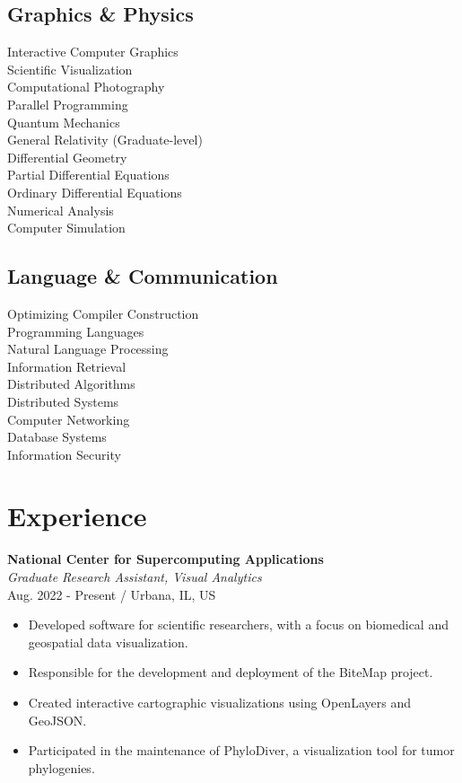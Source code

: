 \documentclass[11pt,twocolumn]{article}
\begin{document}
\subsection*{{Graphics \& Physics}}
Interactive Computer Graphics\\
Scientific Visualization\\
Computational Photography\\
Parallel Programming\\
Quantum Mechanics\\
General Relativity (Graduate-level)\\
Differential Geometry\\
Partial Differential Equations\\
Ordinary Differential Equations\\
Numerical Analysis\\
Computer Simulation

\subsection*{{Language \& Communication}}

Optimizing Compiler Construction\\
Programming Languages\\
Natural Language Processing\\
Information Retrieval\\
Distributed Algorithms\\
Distributed Systems\\
Computer Networking\\
Database Systems\\
Information Security

\newpage

\section*{\textsf{Experience}}

\textbf{National Center for Supercomputing Applications} \\
\textit{Graduate Research Assistant, Visual Analytics} \\
Aug. 2022 - Present / Urbana, IL, US

\begin{itemize}
\item Developed software for scientific researchers, with a focus on biomedical and geospatial data visualization.
\item Responsible for the development and deployment of the BiteMap project.
\item Created interactive cartographic visualizations using OpenLayers and GeoJSON.
\item Participated in the maintenance of PhyloDiver, a visualization tool for tumor phylogenies.
\end{itemize}
\end{document}
